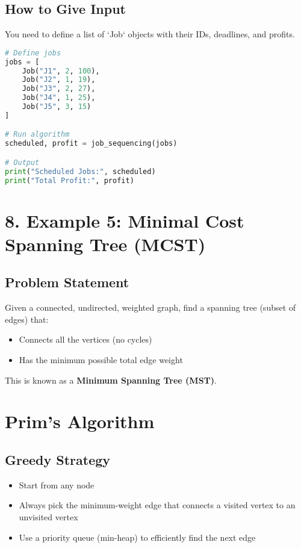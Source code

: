 \documentclass[14pt]{extarticle}
\begin{document}
\subsection*{How to Give Input}

You need to define a list of `Job` objects with their IDs, deadlines, and profits.

\begin{lstlisting}[language=Python]
# Define jobs
jobs = [
    Job("J1", 2, 100),
    Job("J2", 1, 19),
    Job("J3", 2, 27),
    Job("J4", 1, 25),
    Job("J5", 3, 15)
]

# Run algorithm
scheduled, profit = job_sequencing(jobs)

# Output
print("Scheduled Jobs:", scheduled)
print("Total Profit:", profit)
\end{lstlisting}


\section*{8. Example 5: Minimal Cost Spanning Tree (MCST)}

\subsection*{Problem Statement}

Given a connected, undirected, weighted graph, find a spanning tree (subset of edges) that:
\begin{itemize}
    \item Connects all the vertices (no cycles)
    \item Has the minimum possible total edge weight
\end{itemize}

This is known as a \textbf{Minimum Spanning Tree (MST)}.

\newpage
\section*{Prim's Algorithm}

\subsection*{Greedy Strategy}

\begin{itemize}
    \item Start from any node
    \item Always pick the minimum-weight edge that connects a visited vertex to an unvisited vertex
    \item Use a priority queue (min-heap) to efficiently find the next edge
\end{itemize}
\end{document}
